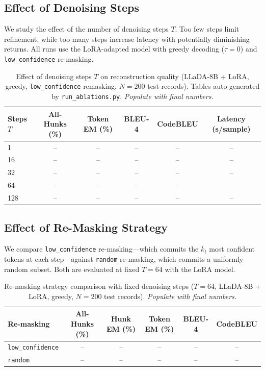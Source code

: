\documentclass[11pt,a4paper]{article}
\begin{document}
\subsection{Effect of Denoising Steps}
\label{sec:abl_steps}

We study the effect of the number of denoising steps \(T\). Too few steps limit
refinement, while too many steps increase latency with potentially diminishing
returns. All runs use the LoRA-adapted model with greedy decoding
(\(\tau=0\)) and \texttt{low\_confidence} re-masking.

\begin{table}[H]
\centering
\caption{Effect of denoising steps $T$ on reconstruction quality
(LLaDA-8B + LoRA, greedy, \texttt{low\_confidence} remasking,
$N=200$ test records).
Tables auto-generated by \texttt{run\_ablations.py}.
\textit{Populate with final numbers.}}
\label{tab:ablation_steps}
\renewcommand{\arraystretch}{1.15}
\begin{tabular}{lccccc}
\toprule
\textbf{Steps $T$} & \textbf{All-Hunks (\%)} & \textbf{Token EM (\%)} & \textbf{BLEU-4} & \textbf{CodeBLEU} & \textbf{Latency (s/sample)} \\
\midrule
1   & -- & -- & -- & -- & -- \\
16  & -- & -- & -- & -- & -- \\
32  & -- & -- & -- & -- & -- \\
64  & -- & -- & -- & -- & -- \\
128 & -- & -- & -- & -- & -- \\
\bottomrule
\end{tabular}
\end{table}

\subsection{Effect of Re-Masking Strategy}
\label{sec:abl_remask}

We compare \texttt{low\_confidence} re-masking—which commits the \(k_t\) most
confident tokens at each step—against \texttt{random} re-masking, which
commits a uniformly random subset. Both are evaluated at fixed \(T=64\) with
the LoRA model.

\begin{table}[H]
\centering
\caption{Re-masking strategy comparison with fixed denoising steps ($T=64$,
LLaDA-8B + LoRA, greedy, $N=200$ test records).
\textit{Populate with final numbers.}}
\label{tab:ablation_remask}
\renewcommand{\arraystretch}{1.15}
\begin{tabular}{lccccc}
\toprule
\textbf{Re-masking} & \textbf{All-Hunks (\%)} & \textbf{Hunk EM (\%)} & \textbf{Token EM (\%)} & \textbf{BLEU-4} & \textbf{CodeBLEU} \\
\midrule
\texttt{low\_confidence} & -- & -- & -- & -- & -- \\
\texttt{random}          & -- & -- & -- & -- & -- \\
\bottomrule
\end{tabular}
\end{table}
\end{document}

